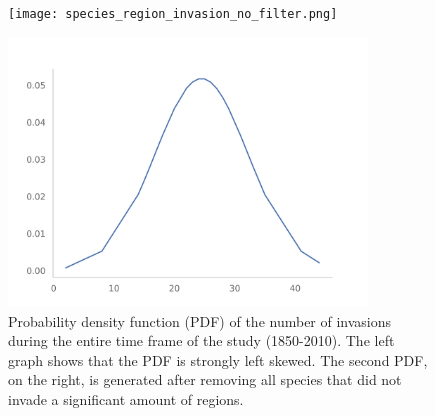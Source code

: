 \documentclass[mscthesis]{usiinfthesis}
\begin{document}



 
\begin{figure}
\centering
\begin{minipage}{.5\textwidth}
  \centering
    \texttt{[image: species\_region\_invasion\_no\_filter.png]}
\end{minipage}%
\begin{minipage}{.5\textwidth}
  \centering
    \includegraphics[width=0.85\textwidth]{species_region_invasion.png}
\end{minipage}
\caption{Probability density function (PDF) of the number of invasions during the entire time frame of the study (1850-2010). The left graph shows that the PDF is strongly left skewed. The second PDF, on the right, is generated after removing all species that did not invade a significant amount of regions.}
\label{fig:pdf_invasion}
\end{figure}

\end{document}
